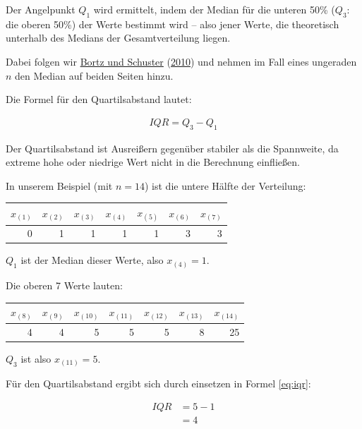 \documentclass[
  11pt,
  ngerman,
  a4paper,
]{report}
\begin{document}
Der Angelpunkt \(Q_1\) wird ermittelt, indem der Median für die unteren 50\% (\(Q_3\): die oberen 50\%) der Werte bestimmt wird -- also jener Werte, die theoretisch unterhalb des Medians der Gesamtverteilung liegen.

Dabei folgen wir \protect\hyperlink{ref-bortz}{Bortz und Schuster} (\protect\hyperlink{ref-bortz}{2010}) und nehmen im Fall eines ungeraden \(n\) den Median auf beiden Seiten hinzu.

Die Formel für den Quartilsabstand lautet:

\[
  \begin{aligned}
    \mathit{IQR}=Q_3-Q_1
  \end{aligned}
  \label{eq:iqr}
\]

Der Quartilsabstand ist Ausreißern gegenüber stabiler als die Spannweite, da extreme hohe oder niedrige Wert nicht in die Berechnung einfließen.

In unserem Beispiel (mit \(n=14\)) ist die untere Hälfte der Verteilung:

\begin{table}[H]
\centering
\begin{tabular}{rrrrrrr}
\toprule
$x_{(1)}$ & $x_{(2)}$ & $x_{(3)}$ & $x_{(4)}$ & $x_{(5)}$ & $x_{(6)}$ & $x_{(7)}$\\
\midrule
0 & 1 & 1 & 1 & 1 & 3 & 3\\
\bottomrule
\end{tabular}
\end{table}

\(Q_1\) ist der Median dieser Werte, also \(x_{(4)}=1\).

Die oberen 7 Werte lauten:

\begin{table}[H]
\centering
\begin{tabular}{rrrrrrr}
\toprule
$x_{(8)}$ & $x_{(9)}$ & $x_{(10)}$ & $x_{(11)}$ & $x_{(12)}$ & $x_{(13)}$ & $x_{(14)}$\\
\midrule
4 & 4 & 5 & 5 & 5 & 8 & 25\\
\bottomrule
\end{tabular}
\end{table}

\(Q_3\) ist also \(x_{(11)} = 5\).

Für den Quartilsabstand ergibt sich durch einsetzen in Formel \eqref{eq:iqr}:

\[
  \begin{aligned}
    \mathit{IQR}&=5-1 \\[4pt]
       &=4 \\[4pt]
  \end{aligned}
\]
\end{document}
